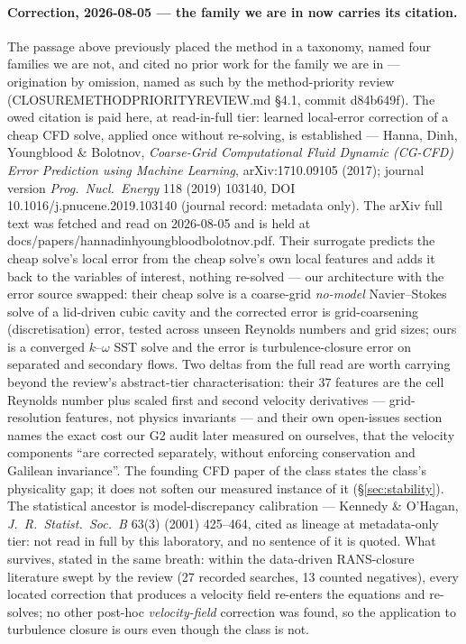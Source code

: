 \documentclass[11pt,a4paper]{article}
\newcommand{\breakus}{\textunderscore\allowbreak}
\newcommand{\code}[1]{{\small\ttfamily\let\_\breakus #1}}
\newcommand{\artifact}[1]{{\footnotesize\ttfamily\let\_\breakus #1}}
\begin{document}
\paragraph{Correction, 2026-08-05 --- the family we are in now carries its citation.} The
passage above previously placed the method in a taxonomy, named four families we are not,
and cited no prior work for the family we are in --- origination by omission, named as such
by the method-priority review (\artifact{CLOSURE\_METHOD\_PRIORITY\_REVIEW.md} \S4.1,
commit \code{d84b649f}). The owed citation is paid here, at read-in-full tier: learned
local-error correction of a cheap CFD solve, applied once without re-solving, is
established --- Hanna, Dinh, Youngblood \& Bolotnov, \emph{Coarse-Grid Computational Fluid
Dynamic (CG-CFD) Error Prediction using Machine Learning}, arXiv:1710.09105 (2017);
journal version \emph{Prog.\ Nucl.\ Energy} 118 (2019) 103140, DOI
10.1016/j.pnucene.2019.103140 (journal record: metadata only). The arXiv full text was
fetched and read on 2026-08-05 and is held at
\artifact{docs/papers/hanna\_dinh\_youngblood\_bolotnov\_1710.09105.pdf}. Their surrogate
predicts the cheap solve's local error from the cheap solve's own local features and adds
it back to the variables of interest, nothing re-solved --- our architecture with the
error source swapped: their cheap solve is a coarse-grid \emph{no-model} Navier--Stokes
solve of a lid-driven cubic cavity and the corrected error is grid-coarsening
(discretisation) error, tested across unseen Reynolds numbers and grid sizes; ours is a
converged $k$--$\omega$ SST solve and the error is turbulence-closure error on separated
and secondary flows. Two deltas from the full read are worth carrying beyond the review's
abstract-tier characterisation: their 37 features are the cell Reynolds number plus scaled
first and second velocity derivatives --- grid-resolution features, not physics
invariants --- and their own open-issues section names the exact cost our G2 audit later
measured on ourselves, that the velocity components ``are corrected separately, without
enforcing conservation and Galilean invariance''. The founding CFD paper of the class
states the class's physicality gap; it does not soften our measured instance of it
(\S\ref{sec:stability}). The statistical ancestor is model-discrepancy calibration ---
Kennedy \& O'Hagan, \emph{J.\ R.\ Statist.\ Soc.\ B} 63(3) (2001) 425--464, cited as
lineage at metadata-only tier: not read in full by this laboratory, and no sentence of it
is quoted. What survives, stated in the same breath: within the data-driven RANS-closure
literature swept by the review (27 recorded searches, 13 counted negatives), every located
correction that produces a velocity field re-enters the equations and re-solves; no other
post-hoc \emph{velocity-field} correction was found, so the application to turbulence
closure is ours even though the class is not.
\end{document}
